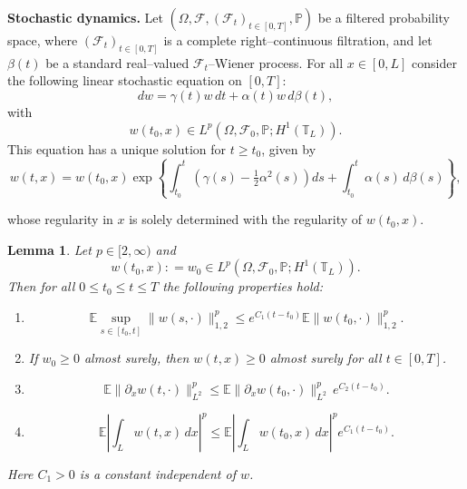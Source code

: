 \documentclass[a4paper,12pt]{article}
\newtheorem{lemma}[definition]{Lemma}
\numberwithin{equation}{section}
\def\d{\partial}
\begin{document}
{\bf Stochastic dynamics.} Let $(\Omega,\mathcal{F},(\mathcal{F}_t)_{t\in [0,T]},\mathbb{P})$
be a filtered probability space, where $(\mathcal{F}_t)_{t\in[0,T]}$
is a complete right--continuous filtration, and let $\beta(t)$ be a standard
real--valued $\mathcal{F}_t$--Wiener process. For all $x \in [0,L]$ consider the following linear stochastic equation
on $[0,T]$:
\begin{equation}
\label{3.4}
dw = \gamma(t) w \, dt + \alpha(t) w \, d\beta(t),
\end{equation}
with
\[
w(t_0, x) \in L^p(\Omega,\mathcal{F}_0,\mathbb{P}; H^1(\mathbb{T}_L)).
\]
This equation has a unique solution for $t \geq t_0$, given by
\begin{equation}
\label{3.5}
w(t,x)
=
w(t_0,x)
\exp\left\{
\int_{t_0}^t \left( \gamma(s) - \tfrac12 \alpha^2(s) \right) ds
+ \int_{t_0}^t \alpha(s) \, d\beta(s)
\right\},
\end{equation}

whose regularity in $x$ is solely determined with the regularity of $w(t_0,x)$. 
\begin{lemma}
\label{lem:3.4}
Let $p \in [2,\infty)$ and
\[
w(t_0,x): = w_0 \in L^p(\Omega,\mathcal{F}_0,\mathbb{P}; H^1(\mathbb{T}_L)).
\]
Then for all $0 \leq t_0 \leq t \leq T$ the following properties hold:
\begin{enumerate}
\item
\begin{equation}
\label{3.6}
\mathbb{E} \sup_{s \in [t_0,t]} \|w(s, \cdot)\|_{1,2}^p
\le e^{C_1(t-t_0)} \mathbb{E} \|w (t_0, \cdot)\|_{1,2}^p.
\end{equation}

\item
If $w_0 \ge 0$ almost surely, then
$w(t,x) \ge 0$ almost surely for all $t \in [0,T]$.



\item 
\begin{equation}
\label{3.7}
\mathbb{E}\|\d_x w(t, \cdot)\|_{L^2}^p
\le
\mathbb{E}\|\d_x w(t_0, \cdot)\|_{L^2}^p \,
e^{C_2 (t-t_0)}.
\end{equation}

\item
\begin{equation}
\label{3.7.1}
\mathbb{E}\left|\int_{L} w(t,x)\,dx\right|^p
\le
\mathbb{E}\left|\int_{L} w(t_0,x)\,dx\right|^p
e^{C_1 (t-t_0)}.
\end{equation}
\end{enumerate}
Here $C_1>0$ is a constant independent of $w$.
\end{lemma}
\end{document}
